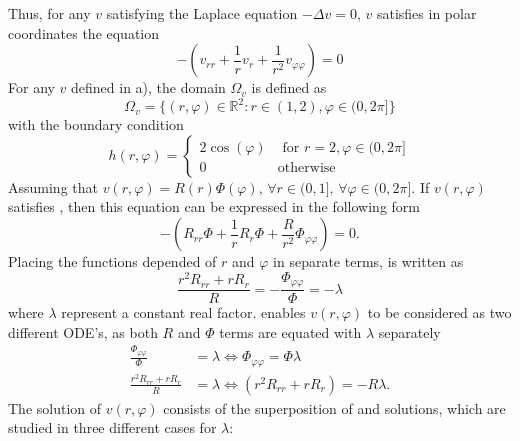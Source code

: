 Thus, for any $v$ satisfying the Laplace equation $-\Delta v = 0$, $v$ satisfies in polar coordinates the equation
\begin{equation}
	\label{eq:laplacePolar}
	-\left(v_{rr} + \frac{1}{r} v_r + \frac{1}{r^2} v_{\varphi\varphi}\right)=0
\end{equation}
%
For any $v$ defined in a), the domain $\Omega_v$ is defined as
\begin{equation}
	\Omega_v = \{(r,\varphi) \in \mathbb{R}^2 \colon r \in (1,2), \varphi \in (0, 2\pi]\}
\end{equation}
with the boundary condition 
\begin{equation}
	\label{eq:boundaryPolar}
	h(r, \varphi) =
	\begin{cases}
		2\cos{(\varphi)} &\text{ for } r = 2,  \varphi \in (0, 2\pi] \\
		0 &\text{otherwise}
	\end{cases}
\end{equation}
%
\newcommand{\constFac}{\lambda}
Assuming that $v(r,\varphi) = R(r)\Phi(\varphi) \text{, } \forall r \in (0,1] \text{, } \forall \varphi \in (0,2\pi]$.
If $v(r,\varphi)$ satisfies , then this equation can be expressed in the following form
\begin{equation}
	\label{eq:laplaceSep}
	-\left(R_{rr} \Phi + \frac{1}{r} R_r \Phi + \frac{R}{r^2} \Phi_{\varphi\varphi}\right) = 0
	\text{.}
\end{equation}
Placing the functions depended of $r$ and $\varphi$ in separate terms,  is written as
\begin{equation}
	\label{eq:laplaceSep2}
	\frac{r^2 R_{rr} + r R_r}{R} = -\frac{\Phi_{\varphi\varphi}}{\Phi} = -\constFac
\end{equation}
where $\constFac$ represent a constant real factor.
 enables $v(r,\varphi)$ to be considered as two different ODE's, as both $R$ and $\Phi$ terms are equated with $\constFac$ separately
%
\begin{align}
	\label{eq:odePhi}
	\frac{\Phi_{\varphi\varphi}}{\Phi} &= \constFac \iff    \Phi_{\varphi\varphi} = \Phi \constFac \\ 
	\label{eq:odeR}
	\frac{r^2 R_{rr} + r R_r}{R} &= \constFac      \iff   \left(r^2 R_{rr} + r R_r \right) = -R \constFac
	\text{.}
\end{align}
%
The solution of $v(r,\varphi)$ consists of the superposition of  and  solutions, which are studied in three different cases for $\lambda$:
